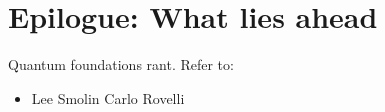 \chapter{Epilogue: What lies ahead}
Quantum foundations rant. Refer to:
\begin{itemize}
\item Lee Smolin
Carlo Rovelli

\end{itemize}